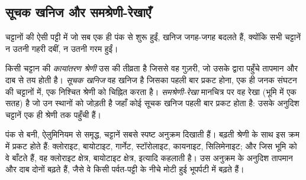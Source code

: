 \subsection{सूचक खनिज और समश्रेणी-रेखाएँ}

चट्टानों की ऐसी पट्टी में जो सब एक ही पंक से शुरू हुईं, खनिज
जगह-जगह बदलते हैं, क्योंकि सभी चट्टानें न उतनी गहरी दबीं, न उतनी
गरम हुईं।

\begin{definition}\label{def:g12:metamorphic-rocks:index-mineral}
किसी चट्टान की \emph{कायांतरण श्रेणी} उस  की
तीव्रता है जिससे वह गुज़री, जो उसके द्वारा पहुँचे तापमान और
दाब से तय होती है। \emph{सूचक खनिज} वह
खनिज है जिसका पहली बार प्रकट होना, एक ही जनक संघटन की चट्टानों में,
एक निश्चित श्रेणी को चिह्नित करता है। \emph{समश्रेणी-रेखा} मानचित्र पर वह रेखा
(भूमि में एक सतह) है जो उन स्थानों को जोड़ती है जहाँ कोई सूचक खनिज पहली बार
प्रकट होता है: उसके अनुदिश चट्टानें एक ही श्रेणी तक पहुँची हैं।
\end{definition}

पंक से बनी, ऐलुमिनियम से समृद्ध, चट्टानें सबसे स्पष्ट अनुक्रम दिखाती हैं।
बढ़ती श्रेणी के साथ  इस क्रम में प्रकट होते हैं: क्लोराइट, बायोटाइट,
गार्नेट, स्टॉरोलाइट, कायनाइट, सिलिमेनाइट; और जिस भूमि को वे बाँटते हैं, वह
क्लोराइट क्षेत्र, बायोटाइट क्षेत्र, इत्यादि कहलाती है। उस अनुक्रम के अनुदिश तापमान और
दाब दोनों बढ़ते हैं, जैसे वे किसी पर्वत-पट्टी के नीचे मोटी हुई भूपर्पटी में
बढ़ते हैं।

